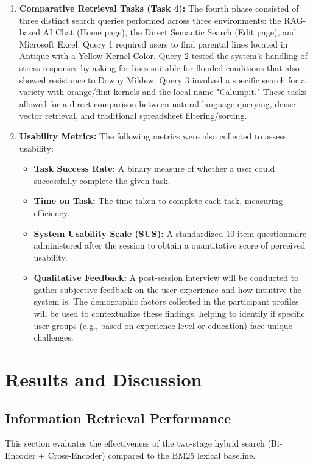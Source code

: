 \documentclass[journal]{./IEEE/IEEEtran}
\begin{document}
\begin{enumerate}
\item \textbf{Comparative Retrieval Tasks (Task 4):} The fourth phase consisted of three distinct search queries performed across three environments: the RAG-based AI Chat (Home page), the Direct Semantic Search (Edit page), and Microsoft Excel. Query 1 required users to find parental lines located in Antique with a Yellow Kernel Color. Query 2 tested the system's handling of stress responses by asking for lines suitable for flooded conditions that also showed resistance to Downy Mildew. Query 3 involved a specific search for a variety with orange/flint kernels and the local name "Calumpit." These tasks allowed for a direct comparison between natural language querying, dense-vector retrieval, and traditional spreadsheet filtering/sorting.
\item \textbf{Usability Metrics:} The following metrics were also collected to assess usability:
\begin{itemize}
\item \textbf{Task Success Rate:} A binary measure of whether a user could successfully complete the given task.
\item \textbf{Time on Task:} The time taken to complete each task, measuring efficiency.
\item \textbf{System Usability Scale (SUS):} A standardized 10-item questionnaire administered after the session to obtain a quantitative score of perceived usability.
\item \textbf{Qualitative Feedback:} A post-session interview will be conducted to gather subjective feedback on the user experience and how intuitive the system is. The demographic factors collected in the participant profiles will be used to contextualize these findings, helping to identify if specific user groups (e.g., based on experience level or education) face unique challenges.
\end{itemize}
\end{enumerate}

\section{Results and Discussion}

\subsection{Information Retrieval Performance}
This section evaluates the effectiveness of the two-stage hybrid search (Bi-Encoder + Cross-Encoder) compared to the BM25 lexical baseline.
\end{document}
